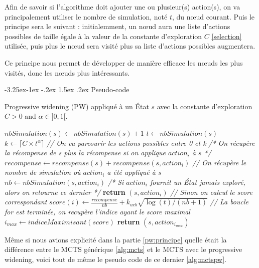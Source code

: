 \documentclass[pdftex,french, english]{article}	%
\makeatletter
\newcounter {subsubsubsection}[subsubsection]
\newcommand\subsubsubsection{\@startsection{subsubsubsection}{4}{\z@}%
                                     {-3.25ex\@plus -1ex \@minus -.2ex}%
                                     {1.5ex \@plus .2ex}%
                                     {\normalfont\normalsize\bfseries}}
\makeatother
\begin{document}
		Afin de savoir si l'algorithme doit ajouter une ou plusieur(s) action(s), on va principalement utiliser le nombre de simulation, noté $t$, du nœud courant.
		Puis le principe sera le suivant : initialemment, un nœud aura une liste d'actions possibles de taille égale à la valeur de la constante d'exploration $C$ \ref{selection} utilisée, puis plus le nœud sera visité plus sa liste d'actions possibles augmentera.

		Ce principe nous permet de développer de manière efficace les nœuds les plus visités, donc les nœuds plus intéressants.

		\subsubsubsection{Pseudo-code} \label{pw:code}

		\begin{algorithm}[H]
			\caption{Progressive widening (PW) appliqué à un État $s$ avec la constante d'exploration $C > 0$ and $\alpha \in ]0, 1[$.}
			\label{alg:spw}
				\begin{algorithmic}[1]
						\State $nbSimulation(s) \gets nbSimulation(s) + 1$ 
						\State $t \gets nbSimulation(s)$
						\State $k \gets \lceil{C \times t^{\alpha}}\rceil$
						\State \textit{// On va parcourir les actions possibles entre 0 et k}
							\State \textit{/* On récupère la récompense de s plus la récompense si on applique $action_{i}$ à $s$ */}
							\State $recompense \gets recompense(s) + recompense(s, action_{i})$
							\State \textit{// On récupère le nombre de simulation où $action_{i}$ a été appliqué à $s$}
							\State $nb \gets nbSimulation(s, action_{i})$
								\State \textit{/* Si $action_{i}$ fournit un État jamais exploré, alors on retourne ce dernier */}
								\State \textbf{return} $(s, action_{i})$
							\Else
								\State \textit{// Sinon on calcul le score correspondant}
								\State $score(i) \gets \frac{recompense}{nb} + \textbf{$k_{ucb}$}\sqrt{\log(t)/(nb + 1)}$							
							\EndIf
						\EndFor
						\State \textit{// La boucle for est terminée, on recupère l'indice ayant le score maximal}
						\State $i_{max} \gets indiceMaximisant(score)$
						\State \textbf{return} $(s, action_{i_{max}})$
					\EndFunction
				\end{algorithmic}
		\end{algorithm}

		Même si nous avions explicité dans la partie \ref{pw:principe} quelle était la différence entre le MCTS générique \ref{alg:mcts} et le MCTS avec le progressive widening, voici tout de même le pseudo code de ce dernier \ref{alg:mctspw}.
\end{document}
